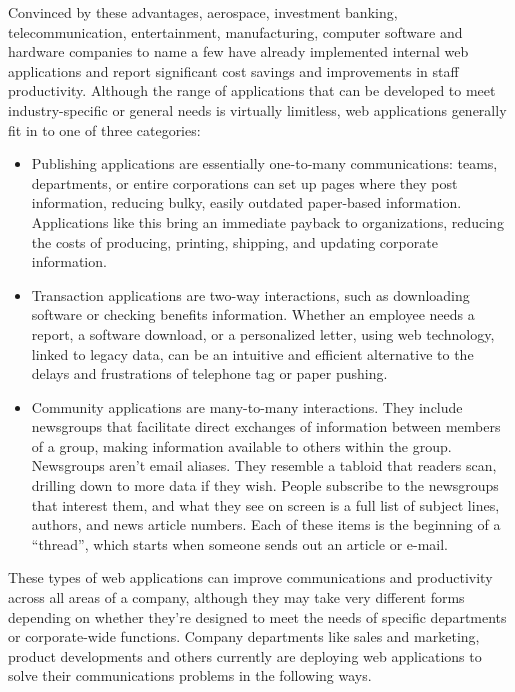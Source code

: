 Convinced by these advantages, aerospace, investment banking,
telecommunication, entertainment, manufacturing, computer software and
hardware companies to name a few have already implemented internal web
applications and report significant cost savings and improvements in
staff productivity. Although the range of applications that can be
developed to meet industry-specific or general needs is virtually
limitless, web applications generally fit in to one of three categories:
\begin{itemize}
  \item Publishing applications are essentially one-to-many
communications: teams, departments, or entire corporations can set up
pages where they post information, reducing bulky, easily outdated
paper-based information. Applications like this bring an immediate
payback to organizations, reducing the costs of producing, printing,
shipping, and updating corporate information.

  \item Transaction applications are two-way interactions, such as
downloading software or checking benefits information. Whether an
employee needs a report, a software download, or a personalized letter,
using web technology, linked to legacy data, can be an intuitive and
efficient alternative to the delays and frustrations of telephone tag
or paper pushing.

  \item Community applications are many-to-many interactions. They include
newsgroups that facilitate direct exchanges of information between
members of a group, making information available to others within the
group. Newsgroups aren't email aliases. They resemble a tabloid that
readers scan, drilling down to more data if they wish. People subscribe
to the newsgroups that interest them, and what they see on screen is a
full list of subject lines, authors, and news article numbers. Each of
these items is the beginning of a ``thread'', which starts when someone
sends out an article or e-mail.
\end{itemize}

These types of web applications can improve communications and
productivity across all areas of a company, although they may take very
different forms depending on whether they're designed to meet the needs
of specific departments or corporate-wide functions. Company
departments like sales and marketing, product developments and others
currently are deploying web applications to solve their communications
problems in the following ways.

